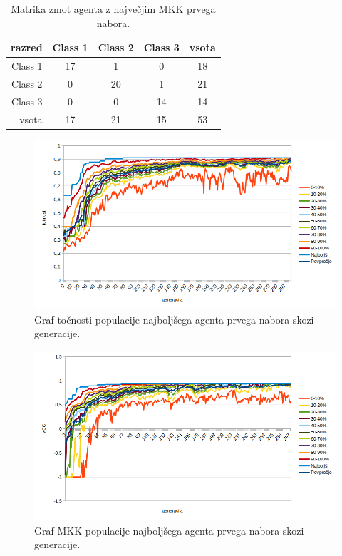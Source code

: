 \begin{table}[H]
    \centering
    \begin{tabular}{||rcccc||}
        \hline
        razred  & Class 1 & Class 2 & Class 3 & vsota \\ \hline
        Class 1 & 17      & 1       & 0       & 18    \\ \hline
        Class 2 & 0       & 20      & 1       & 21    \\ \hline
        Class 3 & 0       & 0       & 14      & 14    \\ \hline
        vsota   & 17      & 21      & 15      & 53    \\ \hline
    \end{tabular}
    \caption{Matrika zmot agenta z največjim MKK prvega nabora.}
    \label{tab:wine_mcc_1}
\end{table}

\begin{figure}[H]
    \begin{center}
        \includegraphics[width=13cm]{wine/1/acc}
    \end{center}
    \caption{Graf točnosti populacije najboljšega agenta prvega nabora skozi generacije.}
    \label{fig:wine_acc_1}
\end{figure}

\begin{figure}[H]
    \begin{center}
        \includegraphics[width=13cm]{wine/1/mcc}
    \end{center}
    \caption{Graf MKK populacije najboljšega agenta prvega nabora skozi generacije.}
    \label{fig:wine_mcc_1}
\end{figure}

